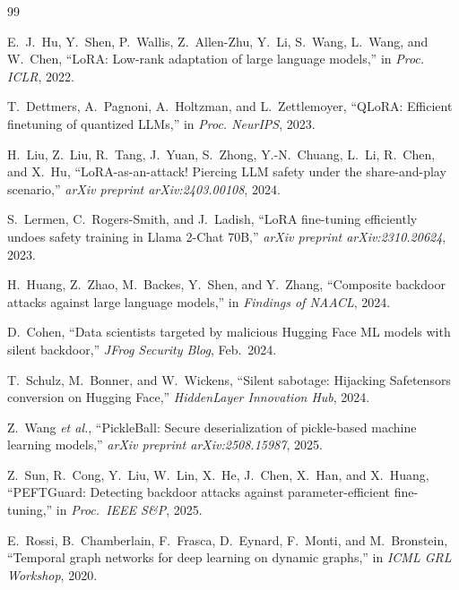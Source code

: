 \documentclass[12pt,a4paper]{article}
\theoremstyle{definition}
\theoremstyle{remark}
\begin{document}

\begin{thebibliography}{99}

E.~J.~Hu, Y.~Shen, P.~Wallis, Z.~Allen-Zhu, Y.~Li, S.~Wang, L.~Wang, and W.~Chen, ``{LoRA}: Low-rank adaptation of large language models,'' in \emph{Proc. ICLR}, 2022.

T.~Dettmers, A.~Pagnoni, A.~Holtzman, and L.~Zettlemoyer, ``{QLoRA}: Efficient finetuning of quantized {LLM}s,'' in \emph{Proc. NeurIPS}, 2023.

H.~Liu, Z.~Liu, R.~Tang, J.~Yuan, S.~Zhong, Y.-N.~Chuang, L.~Li, R.~Chen, and X.~Hu, ``{LoRA}-as-an-attack! Piercing {LLM} safety under the share-and-play scenario,'' \emph{arXiv preprint arXiv:2403.00108}, 2024.

S.~Lermen, C.~Rogers-Smith, and J.~Ladish, ``{LoRA} fine-tuning efficiently undoes safety training in {Llama 2-Chat 70B},'' \emph{arXiv preprint arXiv:2310.20624}, 2023.

H.~Huang, Z.~Zhao, M.~Backes, Y.~Shen, and Y.~Zhang, ``Composite backdoor attacks against large language models,'' in \emph{Findings of NAACL}, 2024.

D.~Cohen, ``Data scientists targeted by malicious {Hugging Face ML} models with silent backdoor,'' \emph{JFrog Security Blog}, Feb.\ 2024.

T.~Schulz, M.~Bonner, and W.~Wickens, ``Silent sabotage: Hijacking {Safetensors} conversion on {Hugging Face},'' \emph{HiddenLayer Innovation Hub}, 2024.

Z.~Wang \emph{et al.}, ``{PickleBall}: Secure deserialization of pickle-based machine learning models,'' \emph{arXiv preprint arXiv:2508.15987}, 2025.

Z.~Sun, R.~Cong, Y.~Liu, W.~Lin, X.~He, J.~Chen, X.~Han, and X.~Huang, ``{PEFTGuard}: Detecting backdoor attacks against parameter-efficient fine-tuning,'' in \emph{Proc.\ IEEE S\&P}, 2025.

E.~Rossi, B.~Chamberlain, F.~Frasca, D.~Eynard, F.~Monti, and M.~Bronstein, ``Temporal graph networks for deep learning on dynamic graphs,'' in \emph{ICML GRL Workshop}, 2020.


\end{thebibliography}
\end{document}
